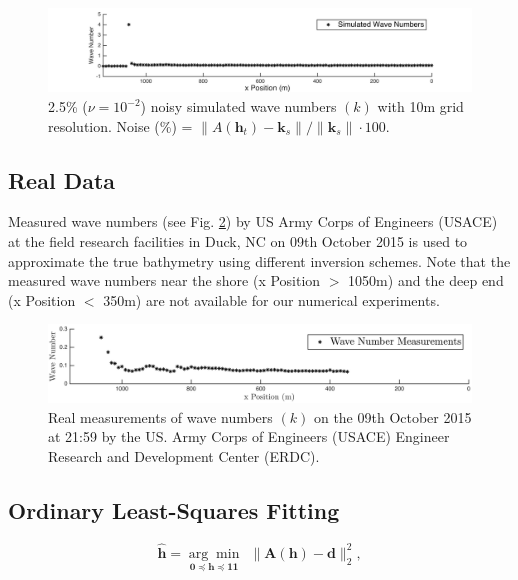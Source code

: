 \begin{figure}[H]
\center
\includegraphics[scale=0.6]{img/simulated_data_k10m.png} 
\caption{2.5\% ($\nu = 10^{-2}$) noisy simulated wave numbers $(k)$ with 10m grid resolution. Noise (\%) = $\|A(\mathbf{h}_t) -  \mathbf{k}_s\| / \|  \mathbf{k}_s \| \cdot 100$. }
\label{Simulated10m}
\end{figure}


\subsection{Real Data}


Measured wave numbers (see Fig. \ref{RealData_oct09}) by US Army Corps of Engineers (USACE) at the field research facilities in Duck, NC on 09th October 2015  is used to approximate the true bathymetry using different inversion schemes. Note that the measured wave numbers near the shore (x Position $>$ 1050m) and the deep end (x Position $<$ 350m) are not available for our numerical experiments. 

\begin{figure}[H]
\center
\includegraphics[scale=0.5]{img/real_data_k_Oct09.png} 
\caption{Real measurements of wave numbers $(k)$ on the 09th October 2015 at 21:59 by the US. Army Corps of Engineers (USACE) Engineer Research and Development Center (ERDC).}
\label{RealData_oct09}
\end{figure}




\subsection{Ordinary Least-Squares Fitting}


\begin{equation}\label{LS-BC}
\mathbf{\hat{h}}= \underset{\mathbf{0} \preceq \mathbf{h} \preceq \mathbf{11} }{\arg \min} \ \  \|  \mathbf{A}(\mathbf{h}) -  \mathbf{d} \|_2^2,
\end{equation}

